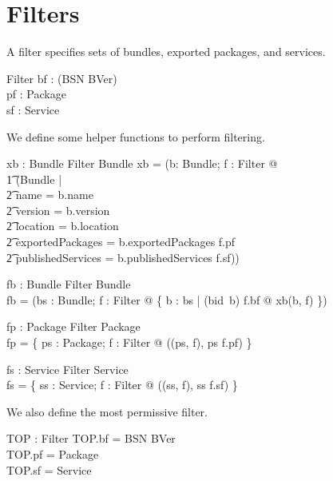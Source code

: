 \documentclass[a4paper,9pt]{article}
\begin{document}
\clearpage
\section{Filters}
\label{cha:filters}

A filter specifies sets of bundles, exported packages, and services.
\begin{schema}{Filter}
  bf : \power (BSN \cross BVer) \\
  pf : \power Package \\
  sf : \power Service \\
\end{schema}

We define some helper functions to perform filtering.
\begin{axdef}
  xb : Bundle \cross Filter \fun Bundle
\where
  xb = (\lambda b: Bundle; f : Filter @ \\
\t1  (\mu Bundle | \\
\t2 name = b.name \land \\
\t2 version = b.version \land \\
\t2 location = b.location \land \\
\t2 exportedPackages = b.exportedPackages \cap f.pf \land \\
\t2 publishedServices = b.publishedServices \cap f.sf))
\end{axdef}

\begin{axdef}
  fb : \power Bundle \cross Filter \fun \power Bundle \\
\where
  fb = (\lambda bs : \power Bundle; f : Filter @ \{ b : bs | (bid~b) \in f.bf @ xb(b, f) \}) \\
\end{axdef}

\begin{axdef}
  fp : \power Package \cross Filter \fun \power Package \\
\where
  fp = \{ ps : \power Package; f : Filter @ ((ps, f), ps \cap f.pf) \}
\end{axdef}

\begin{axdef}
  fs : \power Service \cross Filter \fun \power Service \\
\where
  fs = \{ ss : \power Service; f : Filter @ ((ss, f), ss \cap f.sf) \}
\end{axdef}

We also define the most permissive filter.
\begin{axdef}
  TOP : Filter
\where
  TOP.bf = BSN \cross BVer \\
  TOP.pf = Package \\
  TOP.sf = Service \\
\end{axdef}
\end{document}
